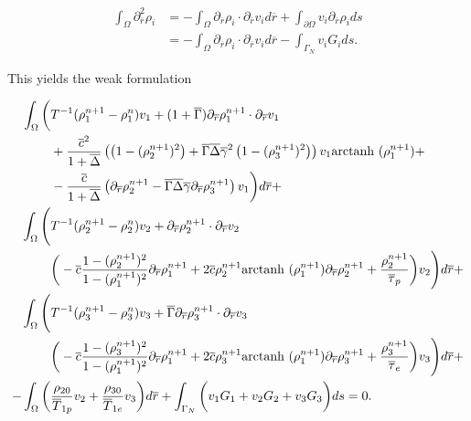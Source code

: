 \documentclass[%
oneside,                 %
final,                   %
10pt]{article}
\begin{document}
\begin{align}
	\int_\Omega \partial_{\overline{r}}^2 \rho_i
	&=
	-\int_\Omega \partial_{\overline{r}} \rho_i \cdot \partial_{\overline{r}} v_i d\overline{r} +
	\int_{\partial\Omega} v_i \partial_{\overline{r}} \rho_i ds
	\\
	&= 
	-\int_\Omega \partial_{\overline{r}} \rho_i \cdot \partial_{\overline{r}} v_i d\overline{r} -
	\int_{\Gamma_N} v_i G_i ds.
\end{align}

This yields the weak formulation

\begin{align}
	\int_\Omega \bigg( 
		&T^{-1} (\rho_1^{n+1}-\rho_1^n) v_1 +
		(1+\overline{\Gamma}) 
		\partial_{\overline{r}} \rho_1^{n+1} \cdot \partial_{\overline{r}} v_1 \nonumber \\
		&+ \frac{\overline{c}^2}{1+\overline{\Delta}}
		\left(
			\left(
				1 - (\rho_2^{n+1})^2
			\right)
			+
			\overline{\Gamma}\overline{\Delta}\overline{\gamma}^2
			\left(
				1 - (\rho_3^{n+1})^2
			\right)
		\right)
		v_1
		\text{arctanh }(\rho_1^{n+1}) + 
		\nonumber\\
		&-\frac{\overline{c}}{1+\overline{\Delta}}
		\left(
			\partial_{\overline{r}} \rho_2^{n+1} - \overline{\Gamma}\overline{\Delta}\overline{\gamma} \partial_{\overline{r}} \rho_3^{n+1}
		\right) v_1 
	\bigg) d\overline{r} + \nonumber\\
	\int_\Omega \Bigg(
		&T^{-1} (\rho_2^{n+1}-\rho_2^n) v_2
		+\partial_{\overline{r}} \rho_2^{n+1} \cdot \partial_{\overline{r}} v_2 \nonumber \\
		&\bigg(
		  -\overline{c} \frac{1-(\rho_2^{n+1})^2}{1-(\rho_1^{n+1})^2} \partial_{\overline{r}}\rho_1^{n+1}
		  + 2 \overline{c} \rho_2^{n+1} \text{arctanh }(\rho_1^{n+1}) \partial_{\overline{r}}\rho_2^{n+1}
		  + \dfrac{\rho_2^{n+1}}{\overline{\tau}_p}
		\bigg)
		v_2
	\Bigg) d\overline{r} + \nonumber\\
	\int_\Omega \Bigg(
		&T^{-1} (\rho_3^{n+1}-\rho_3^n) v_3 
		+\overline{\Gamma}\partial_{\overline{r}} \rho_3^{n+1} \cdot \partial_{\overline{r}} v_3 \nonumber \\
		&\bigg(
		  -\overline{c} \frac{1-(\rho_3^{n+1})^2}{1-(\rho_1^{n+1})^2} \partial_{\overline{r}}\rho_1^{n+1}
		  + 2 \overline{c} \rho_3^{n+1} \text{arctanh }(\rho_1^{n+1}) \partial_{\overline{r}}\rho_3^{n+1} 
		  + \dfrac{\rho_3^{n+1}}{\overline{\tau}_e}
		\bigg)
		v_3 
	\Bigg)
	d\overline{r} + \nonumber\\
	-\int_\Omega \bigg(
		&\dfrac{\rho_{20}}{\overline{T}_{1p}} v_2 +
		\dfrac{\rho_{30}}{\overline{T}_{1e}} v_3	
	\bigg)
	d\overline{r}
	+\int_{\Gamma_N} \bigg(
		v_1 G_1 + v_2 G_2 + v_3 G_3
	\bigg)
	ds
	= 0.
\end{align}








\end{document}
